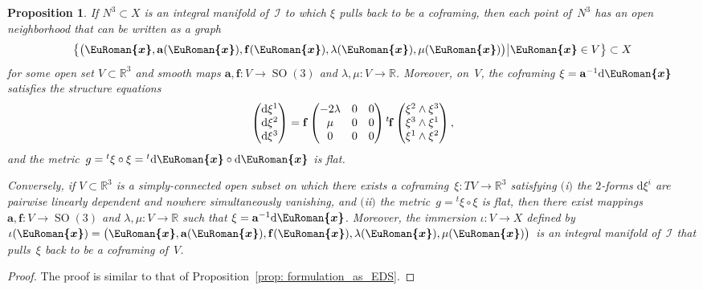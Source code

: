 \documentclass[pdftex]{sigma}
\numberwithin{equation}{section}
\newtheorem{Proposition}[Theorem]{Proposition}
 { \theoremstyle{definition}
\newtheorem{Example}[Theorem]{Example}
\newtheorem{Remark}[Theorem]{Remark} }
\newcommand{\eurom}{\EuRoman}
\renewcommand{\d}{\mathrm{d}}%
\newcommand{\cI}{{\mathcal I}}
\newcommand{\bbR}{{\mathbb R}}
\newcommand{\SO}{\operatorname{SO}}
\newcommand{\mba}{\mathbf{a}}
\newcommand{\mbf}{\mathbf{f}}
\newcommand{\eurox}{\bm{\eurom{x}}}
\begin{document}
\begin{Proposition}\label{prop: formulation_as_EDS-rank1}
If $N^3\subset X$ is an integral manifold of~$\cI$ to which $\xi$ pulls back to be a coframing, then each point of~$N^3$ has an open neighborhood that can be written as a graph
\[ \bigl\{\bigl(\eurox, \mba(\eurox), \mbf(\eurox), \lambda(\eurox), \mu(\eurox) \bigr)\, \vrule\, \eurox \in V \bigr\} \subset X \]
for some open set $V \subset \bbR^3$ and smooth maps $\mba, \mbf\colon V \to \SO(3)$ and $\lambda, \mu\colon V \to \bbR$. Moreover, on~$V$, the coframing $\xi = \mba^{-1} \d \eurox$ satisfies the structure equations
\begin{gather*} %
\begin{pmatrix} \d\xi^1 \\ \d\xi^2 \\ \d\xi^3 \end{pmatrix} = \mbf \begin{pmatrix} -2\lambda & 0 & 0 \\ \mu & 0 & 0 \\ 0 & 0 & 0 \end{pmatrix} {}^t\hskip-1pt \mbf
\begin{pmatrix} \xi^2 \wedge \xi^3 \\ \xi^3 \wedge \xi^1 \\ \xi^1 \wedge \xi^2 \end{pmatrix},
\end{gather*}
and the metric~$g = {}^t\xi\circ \xi = {}^t\d \eurox\circ \d \eurox$ is flat.

Conversely, if $V\subset \bbR^3$ is a simply-connected open subset on which there exists a coframing~$\xi\colon TV\to\bbR^3$ satisfying $($i$)$ the $2$-forms $\d\xi^i$ are pairwise linearly dependent and nowhere simultaneously vanishing, and $($ii$)$ the metric~$g={}^t\xi\circ \xi$ is flat, then there exist mappings~$\mba, \mbf\colon V \to \SO(3)$ and $\lambda, \mu\colon V \to \bbR$ such that $\xi = \mba^{-1} \d \eurox$. Moreover, the immersion $\iota\colon V\to X$ defined by $\iota(\eurox) = \bigl(\eurox, \mba(\eurox), \mbf(\eurox), \lambda(\eurox), \mu(\eurox) \bigr)$ is an integral manifold of~$\cI$ that pulls~$\xi$ back to be a coframing of~$V$.
\end{Proposition}

\begin{proof}The proof is similar to that of Proposition~\ref{prop: formulation_as_EDS}.
\end{proof}
\end{document}
